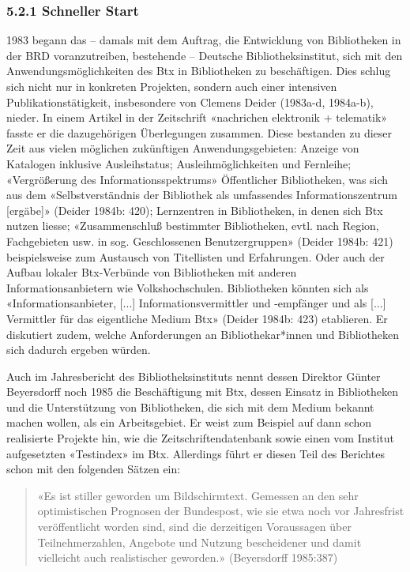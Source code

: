 \documentclass[a4paper,
fontsize=11pt,
oneside,
numbers=noperiodatend,
parskip=half-,
bibliography=totoc,
final
]{scrartcl}
\begin{document}
\hypertarget{schneller-start}{%
\subsubsection{5.2.1 Schneller Start}\label{schneller-start}}

1983 begann das -- damals mit dem Auftrag, die Entwicklung von
Bibliotheken in der BRD voranzutreiben, bestehende -- Deutsche
Bibliotheksinstitut, sich mit den Anwendungsmöglichkeiten des Btx in
Bibliotheken zu beschäftigen. Dies schlug sich nicht nur in konkreten
Projekten, sondern auch einer intensiven Publikationstätigkeit,
insbesondere von Clemens Deider (1983a-d, 1984a-b), nieder. In einem
Artikel in der Zeitschrift «nachrichen elektronik + telematik» fasste er
die dazugehörigen Überlegungen zusammen. Diese bestanden zu dieser Zeit
aus vielen möglichen zukünftigen Anwendungsgebieten: Anzeige von
Katalogen inklusive Ausleihstatus; Ausleihmöglichkeiten und Fernleihe;
«Vergrößerung des Informationsspektrums» Öffentlicher Bibliotheken, was
sich aus dem «Selbstverständnis der Bibliothek als umfassendes
Informationszentrum {[}ergäbe{]}» (Deider 1984b: 420); Lernzentren in
Bibliotheken, in denen sich Btx nutzen liesse; «Zusammenschluß
bestimmter Bibliotheken, evtl. nach Region, Fachgebieten usw. in sog.
Geschlossenen Benutzergruppen» (Deider 1984b: 421) beispielsweise zum
Austausch von Titellisten und Erfahrungen. Oder auch der Aufbau lokaler
Btx-Verbünde von Bibliotheken mit anderen Informationsanbietern wie
Volkshochschulen. Bibliotheken könnten sich als «Informationsanbieter,
{[}...{]} Informationsvermittler und -empfänger und als {[}...{]}
Vermittler für das eigentliche Medium Btx» (Deider 1984b: 423)
etablieren. Er diskutiert zudem, welche Anforderungen an
Bibliothekar*innen und Bibliotheken sich dadurch ergeben würden.

Auch im Jahresbericht des Bibliotheksinstituts nennt dessen Direktor
Günter Beyersdorff noch 1985 die Beschäftigung mit Btx, dessen Einsatz
in Bibliotheken und die Unterstützung von Bibliotheken, die sich mit dem
Medium bekannt machen wollen, als ein Arbeitsgebiet. Er weist zum
Beispiel auf dann schon realisierte Projekte hin, wie die
Zeitschriftendatenbank sowie einen vom Institut aufgesetzten «Testindex»
im Btx. Allerdings führt er diesen Teil des Berichtes schon mit den
folgenden Sätzen ein:

\begin{quote}
«Es ist stiller geworden um Bildschirmtext. Gemessen an den sehr
optimistischen Prognosen der Bundespost, wie sie etwa noch vor
Jahresfrist veröffentlicht worden sind, sind die derzeitigen Voraussagen
über Teilnehmerzahlen, Angebote und Nutzung bescheidener und damit
vielleicht auch realistischer geworden.» (Beyersdorff 1985:387)
\end{quote}
\end{document}
